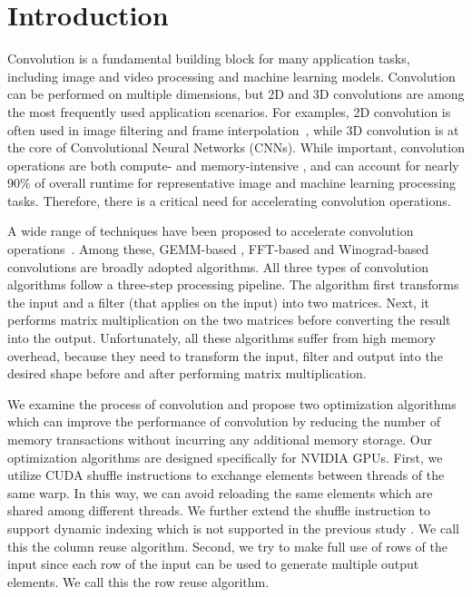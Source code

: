 \section{Introduction}
Convolution is a fundamental building block for many application tasks, including image and video processing and machine learning
models\FIXME{\cite{}}. Convolution can be performed on multiple dimensions, but 2D and 3D convolutions are among the most frequently used
application scenarios. For examples, 2D convolution is often used in image filtering and frame
interpolation~\cite{Perrot2014Fine,Ma2014Optimized,Rudi2015Image,Niklaus2017Video}, while 3D convolution is at the core of Convolutional
Neural Networks (CNNs). While important, convolution operations are both compute- and memory-intensive \cite{cavigelli2015accelerating},
and can account for nearly 90\% of overall runtime \cite{Li2016Performance} for representative image and machine learning processing tasks.
Therefore, there is a critical need for accelerating convolution operations.


A wide range of techniques have been proposed to accelerate convolution
operations~\cite{Iandola2014Communication,vasilache2014fast,lavin2016fast,cho2017mec,Zhen2018Optimizing,Vasudevan2017Parallel,Chellapilla2006High}.
 Among these, GEMM-based
\cite{Vasudevan2017Parallel} \cite{Chellapilla2006High}, FFT-based \cite{vasilache2014fast} and Winograd-based convolutions
\cite{lavin2016fast} are broadly adopted algorithms. All three types of convolution algorithms follow a three-step processing pipeline. The
algorithm first transforms the input and a filter (that applies on the input) into two matrices. Next, it performs matrix multiplication on
the two matrices before converting the result into the output. Unfortunately, all these algorithms suffer from high memory overhead,
because they need to transform the input, filter and output into the desired shape before and after performing matrix multiplication.

We examine the process of convolution and propose two optimization algorithms which can improve the performance of convolution by reducing
the number of memory transactions without incurring any additional memory storage. Our optimization algorithms are designed specifically
for NVIDIA GPUs. First, we utilize CUDA shuffle instructions to exchange elements between threads of the same warp. In this way, we can
avoid reloading the same elements which are shared among different threads. We further extend the shuffle instruction to support dynamic
indexing which is not supported in the previous study \cite{vasilache2014fast}. We call this the column reuse algorithm. Second, we try to
make full use of rows of the input since each row of the input can be used to generate multiple output elements. We call this the row reuse
algorithm.

